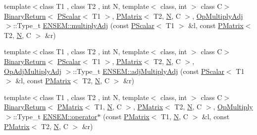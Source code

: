 \begin{DoxyCompactItemize}
\item 
{\footnotesize template$<$class T1 , class T2 , int N, template$<$ class, int $>$ class C$>$ }\\\mbox{\hyperlink{structENSEM_1_1BinaryReturn}{Binary\+Return}}$<$ \mbox{\hyperlink{classENSEM_1_1PScalar}{P\+Scalar}}$<$ T1 $>$, \mbox{\hyperlink{classENSEM_1_1PMatrix}{P\+Matrix}}$<$ T2, \mbox{\hyperlink{operator__name__util_8cc_a7722c8ecbb62d99aee7ce68b1752f337}{N}}, C $>$, \mbox{\hyperlink{structENSEM_1_1OpMultiplyAdj}{Op\+Multiply\+Adj}} $>$\+::Type\+\_\+t \mbox{\hyperlink{group__primmatrix_ga500e40c33d8e7e4a2a95970fb8a56326}{E\+N\+S\+E\+M\+::multiply\+Adj}} (const \mbox{\hyperlink{classENSEM_1_1PScalar}{P\+Scalar}}$<$ T1 $>$ \&l, const \mbox{\hyperlink{classENSEM_1_1PMatrix}{P\+Matrix}}$<$ T2, \mbox{\hyperlink{operator__name__util_8cc_a7722c8ecbb62d99aee7ce68b1752f337}{N}}, C $>$ \&r)
\item 
{\footnotesize template$<$class T1 , class T2 , int N, template$<$ class, int $>$ class C$>$ }\\\mbox{\hyperlink{structENSEM_1_1BinaryReturn}{Binary\+Return}}$<$ \mbox{\hyperlink{classENSEM_1_1PScalar}{P\+Scalar}}$<$ T1 $>$, \mbox{\hyperlink{classENSEM_1_1PMatrix}{P\+Matrix}}$<$ T2, \mbox{\hyperlink{operator__name__util_8cc_a7722c8ecbb62d99aee7ce68b1752f337}{N}}, C $>$, \mbox{\hyperlink{structENSEM_1_1OpAdjMultiplyAdj}{Op\+Adj\+Multiply\+Adj}} $>$\+::Type\+\_\+t \mbox{\hyperlink{group__primmatrix_ga5b52c2e633a016e706b74e388b8af102}{E\+N\+S\+E\+M\+::adj\+Multiply\+Adj}} (const \mbox{\hyperlink{classENSEM_1_1PScalar}{P\+Scalar}}$<$ T1 $>$ \&l, const \mbox{\hyperlink{classENSEM_1_1PMatrix}{P\+Matrix}}$<$ T2, \mbox{\hyperlink{operator__name__util_8cc_a7722c8ecbb62d99aee7ce68b1752f337}{N}}, C $>$ \&r)
\item 
{\footnotesize template$<$class T1 , class T2 , int N, template$<$ class, int $>$ class C$>$ }\\\mbox{\hyperlink{structENSEM_1_1BinaryReturn}{Binary\+Return}}$<$ \mbox{\hyperlink{classENSEM_1_1PMatrix}{P\+Matrix}}$<$ T1, \mbox{\hyperlink{operator__name__util_8cc_a7722c8ecbb62d99aee7ce68b1752f337}{N}}, C $>$, \mbox{\hyperlink{classENSEM_1_1PMatrix}{P\+Matrix}}$<$ T2, \mbox{\hyperlink{operator__name__util_8cc_a7722c8ecbb62d99aee7ce68b1752f337}{N}}, C $>$, \mbox{\hyperlink{structENSEM_1_1OpMultiply}{Op\+Multiply}} $>$\+::Type\+\_\+t \mbox{\hyperlink{group__primmatrix_ga8f46104c9d9d10301141fdd1c0546a36}{E\+N\+S\+E\+M\+::operator$\ast$}} (const \mbox{\hyperlink{classENSEM_1_1PMatrix}{P\+Matrix}}$<$ T1, \mbox{\hyperlink{operator__name__util_8cc_a7722c8ecbb62d99aee7ce68b1752f337}{N}}, C $>$ \&l, const \mbox{\hyperlink{classENSEM_1_1PMatrix}{P\+Matrix}}$<$ T2, \mbox{\hyperlink{operator__name__util_8cc_a7722c8ecbb62d99aee7ce68b1752f337}{N}}, C $>$ \&r)

\end{DoxyCompactItemize}
